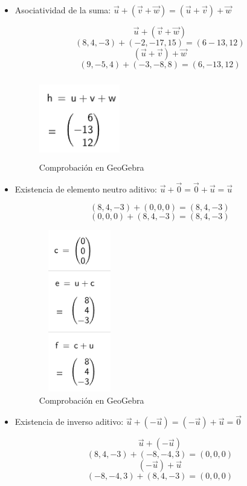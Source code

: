 \begin{itemize}
    \item Asociatividad de la suma: \(\vec{u}+(\vec{v}+\vec{w})=(\vec{u}+\vec{v})+\vec{w}\)
    
    \[
        \vec{u}+(\vec{v}+\vec{w})
    \]
    \[
        (8,4,-3)+(-2,-17,15)=(6-13,12)
    \]
    \[
        (\vec{u}+\vec{v})+\vec{w}
    \]
    \[
        (9,-5,4)+(-3,-8,8)=(6,-13,12)
    \]

    \begin{figure}[ht!]
        \centering
        \includegraphics[width=100pt,height=100pt]{img/imagen3.png}
        \caption{Comprobación en GeoGebra}
    \end{figure}

    \item Existencia de elemento neutro aditivo: \(\vec{u}+\vec{0}=\vec{0}+\vec{u}=\vec{u}\)
    

    \[
        (8,4,-3)+(0,0,0)=(8,4,-3)
    \]
    \[
        (0,0,0)+(8,4,-3)=(8,4,-3)
    \]

    \begin{figure}[ht!]
        \centering
        \includegraphics[width=100pt,height=200pt]{img/imagen4.png}
        \caption{Comprobación en GeoGebra}
    \end{figure}

    \item Existencia de inverso aditivo: \(\vec{u}+(-\vec{u})=(-\vec{u})+\vec{u}=\vec{0}\)
    
    \[
        \vec{u}+(-\vec{u})
    \]
    \[
        (8,4,-3)+(-8,-4,3)=(0,0,0)
    \]
    \[
        (-\vec{u})+\vec{u}
    \]
    \[
        (-8,-4,3)+(8,4,-3)=(0,0,0)
    \]


\end{itemize}
